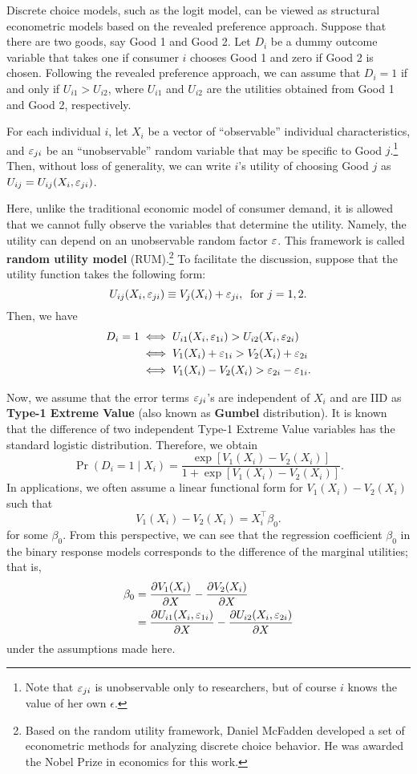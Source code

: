 \documentclass[11pt, A4paper, openany, uplatex]{book}
\begin{document}
Discrete choice models, such as the logit model, can be viewed as structural econometric models based on the revealed preference approach.
Suppose that there are two goods, say Good 1 and Good 2.
Let $D_i$ be a dummy outcome variable that takes one if consumer $i$ chooses Good 1 and zero if Good 2 is chosen.
Following the revealed preference approach, we can assume that $D_i = 1$ if and only if $U_{i1} > U_{i2}$, where $U_{i1}$ and $U_{i2}$ are the utilities obtained from Good 1 and Good 2, respectively.

For each individual $i$, let $X_i$ be a vector of ``observable'' individual characteristics, and $\varepsilon_{ji}$ be an ``unobservable'' random variable that may be specific to Good $j$.\footnote{
	Note that $\varepsilon_{ji}$ is unobservable only to researchers, but of course $i$ knows the value of her own $\epsilon$.
	}
Then, without loss of generality, we can write $i$'s utility of choosing Good $j$ as $U_{ij} = U_{ij}(X_i, \varepsilon_{ji})$.

Here, unlike the traditional economic model of consumer demand, it is allowed that we cannot fully observe the variables that determine the utility.
Namely, the utility can depend on an unobservable random factor $\varepsilon$.
This framework is called \textbf{random utility model} (RUM).\footnote{
	Based on the random utility framework, Daniel McFadden developed a set of econometric methods for analyzing discrete choice behavior. 
	He was awarded the Nobel Prize in economics for this work.
	}
To facilitate the discussion, suppose that the utility function takes the following form:
\[
	U_{ij}(X_i, \varepsilon_{ji}) \equiv V_j(X_i) + \varepsilon_{ji}, \;\; \text{for $j = 1,2$}.
\]
Then, we have
\begin{align*}
	D_i = 1
	& \iff U_{i1}(X_i, \varepsilon_{1i}) > U_{i2}(X_i, \varepsilon_{2i}) \\
	& \iff  V_1(X_i) + \varepsilon_{1i} >  V_2(X_i) + \varepsilon_{2i} \\
	& \iff  V_1(X_i) - V_2(X_i) > \varepsilon_{2i} - \varepsilon_{1i}.
\end{align*}

Now, we assume that the error terms $\varepsilon_{ji}$'s are independent of $X_i$ and are IID as \textbf{Type-1 Extreme Value} (also known as \textbf{Gumbel} distribution).
It is known that the difference of two independent Type-1 Extreme Value variables has the standard logistic distribution.
Therefore, we obtain
\[
	\Pr(D_i = 1 \mid X_i) = \frac{\exp[V_1(X_i) - V_2(X_i)]}{1 + \exp[V_1(X_i) - V_2(X_i)]}.
\]
In applications, we often assume a linear functional form for $V_1(X_i) - V_2(X_i)$ such that
\[
	V_1(X_i) - V_2(X_i) = X_i^\top \beta_0.
\]
for some $\beta_0$.
From this perspective, we can see that the regression coefficient $\beta_0$ in the binary response models corresponds to the difference of the marginal utilities; that is, 
\begin{align*}
	\beta_0 
	& = \frac{\partial V_1(X_i)}{\partial X} - \frac{\partial V_2(X_i)}{\partial X}\\
	& = \frac{\partial U_{i1}(X_i, \varepsilon_{1i})}{\partial X} - \frac{\partial U_{i2}(X_i, \varepsilon_{2i})}{\partial X}
\end{align*}
under the assumptions made here.
\end{document}
